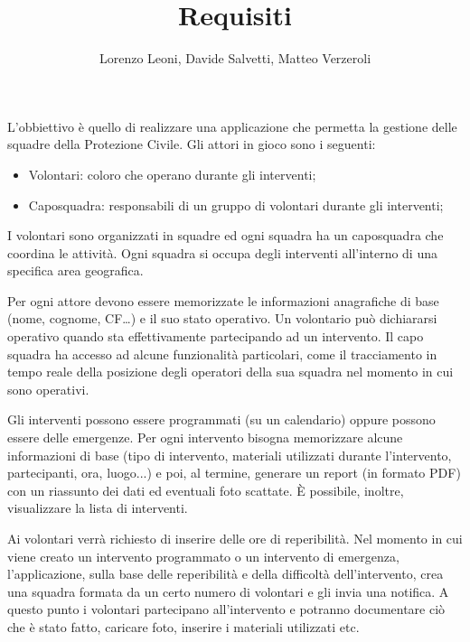 \documentclass[
		a4paper,
		cleardoublepage=empty,
		headings=twolinechapter,
		numbers=autoenddot,
]{article}
\title{Requisiti}
\author{Lorenzo Leoni, Davide Salvetti, Matteo Verzeroli}
\begin{document}
	\maketitle
	L’obbiettivo è quello di realizzare una applicazione che permetta la gestione delle squadre della Protezione Civile.  
	Gli attori in gioco sono i seguenti: 
	\begin{itemize}
		\item Volontari: coloro che operano durante gli interventi; 
		\item Caposquadra: responsabili di un gruppo di volontari durante gli interventi; 
	\end{itemize}

	I volontari sono organizzati in squadre ed ogni squadra ha un caposquadra che coordina le attività. Ogni squadra si occupa degli interventi all’interno di una specifica area geografica.
	
	Per ogni attore devono essere memorizzate le informazioni anagrafiche di base (nome, cognome, CF…) e il suo stato operativo. Un volontario può dichiararsi operativo quando sta effettivamente partecipando ad un intervento. Il capo squadra ha accesso ad alcune funzionalità particolari, come il tracciamento in tempo reale della posizione degli operatori della sua squadra nel momento in cui sono operativi. 
	
	Gli interventi possono essere programmati (su un calendario) oppure possono essere delle emergenze. Per ogni intervento bisogna memorizzare alcune informazioni di base (tipo di intervento, materiali utilizzati durante l’intervento, partecipanti, ora, luogo...) e poi, al termine, generare un report (in formato PDF) con un riassunto dei dati ed eventuali foto scattate. È possibile, inoltre, visualizzare la lista di interventi.  
	
	Ai volontari verrà richiesto di inserire delle ore di reperibilità. Nel momento in cui viene creato un intervento programmato o un intervento di emergenza, l’applicazione, sulla base delle reperibilità e della difficoltà dell’intervento, crea una squadra formata da un certo numero di volontari e gli invia una notifica. A questo punto i volontari partecipano all’intervento e potranno documentare ciò che è stato fatto, caricare foto, inserire i materiali utilizzati etc. 
	
\end{document}
